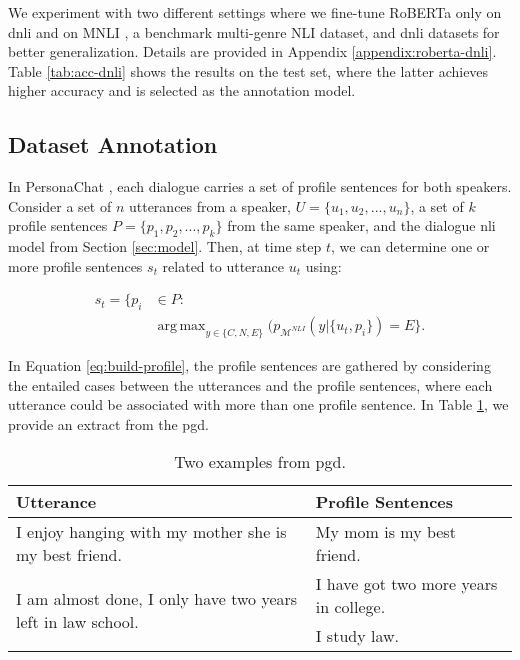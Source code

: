 \documentclass[11pt]{article}
\DeclareMathOperator*{\argmax}{arg\,max}
\begin{document}
We experiment with two different settings where we fine-tune RoBERTa only on \gls*{dnli} and on MNLI \cite{MNLI}, a benchmark multi-genre NLI dataset, and \gls*{dnli} datasets for better generalization.
Details are provided in Appendix \ref{appendix:roberta-dnli}.
Table \ref{tab:acc-dnli} shows the results on the test set, where the latter achieves higher accuracy and is selected as the annotation model.

\subsection{Dataset Annotation}

In PersonaChat \cite{PERSONACHAT}, each dialogue carries a set of profile sentences for both speakers.
Consider a set of \(n\) utterances from a speaker, \(U=\{u_1, u_2, ..., u_n\}\), a set of \(k\) profile sentences \(P=\{p_1, p_2, ..., p_k\}\) from the same speaker, and the dialogue \gls*{nli} model from Section \ref{sec:model}.
Then, at time step \(t\), we can determine one or more profile sentences \(s_t\) related to utterance \(u_t\) using:



\begin{equation}
\label{eq:build-profile}
    \begin{split}
s_t =  \{p_i &\in P : \\
    &\argmax_{y \in \{C, N, E\}}(p_{\mathcal{M}^{NLI}}(y|\{u_t, p_i\}) = E \}.
    \end{split}
\end{equation}

In Equation \ref{eq:build-profile}, the profile sentences are gathered by considering the entailed cases between the utterances and the profile sentences, where each utterance could be associated with more than one profile sentence. 
In Table \ref{tab:example}, we provide an extract from the \gls*{pgd}.

\begin{table}[ht]
    \centering
    \begin{tabular}{p{}|p{}}
    \hline
    \textbf{Utterance} & \textbf{Profile Sentences} \\
    \hline 
    I enjoy hanging with my mother she is my best friend. & My mom is my best friend.\\
    \hline
\multirow{2}{0.45\columnwidth}{I am almost done, I only have two years left in law school.} & I have got two more years in college. \\ \cline{2-2}
    & I study law. \\
    \hline
    \end{tabular}
\caption{Two examples from \gls*{pgd}.}
\label{tab:example}
\end{table}
\end{document}
